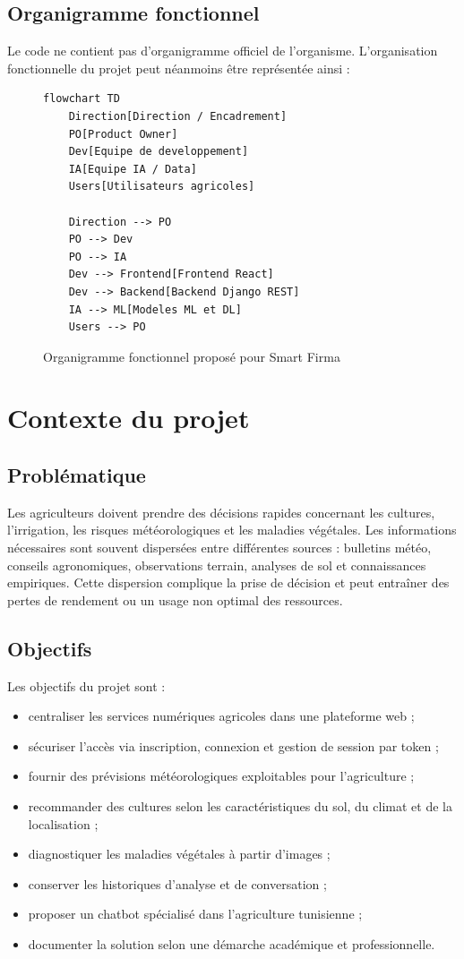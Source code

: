 \subsection{Organigramme fonctionnel}
Le code ne contient pas d'organigramme officiel de l'organisme. L'organisation fonctionnelle du projet peut néanmoins être représentée ainsi :

\begin{figure}[H]
\centering
\caption{Organigramme fonctionnel proposé pour Smart Firma}
\begin{lstlisting}[language=mermaid]
flowchart TD
    Direction[Direction / Encadrement]
    PO[Product Owner]
    Dev[Equipe de developpement]
    IA[Equipe IA / Data]
    Users[Utilisateurs agricoles]

    Direction --> PO
    PO --> Dev
    PO --> IA
    Dev --> Frontend[Frontend React]
    Dev --> Backend[Backend Django REST]
    IA --> ML[Modeles ML et DL]
    Users --> PO
\end{lstlisting}
\end{figure}

\section{Contexte du projet}
\subsection{Problématique}
Les agriculteurs doivent prendre des décisions rapides concernant les cultures, l'irrigation, les risques météorologiques et les maladies végétales. Les informations nécessaires sont souvent dispersées entre différentes sources : bulletins météo, conseils agronomiques, observations terrain, analyses de sol et connaissances empiriques. Cette dispersion complique la prise de décision et peut entraîner des pertes de rendement ou un usage non optimal des ressources.

\subsection{Objectifs}
Les objectifs du projet sont :
\begin{itemize}[noitemsep]
  \item centraliser les services numériques agricoles dans une plateforme web ;
  \item sécuriser l'accès via inscription, connexion et gestion de session par token ;
  \item fournir des prévisions météorologiques exploitables pour l'agriculture ;
  \item recommander des cultures selon les caractéristiques du sol, du climat et de la localisation ;
  \item diagnostiquer les maladies végétales à partir d'images ;
  \item conserver les historiques d'analyse et de conversation ;
  \item proposer un chatbot spécialisé dans l'agriculture tunisienne ;
  \item documenter la solution selon une démarche académique et professionnelle.
\end{itemize}

